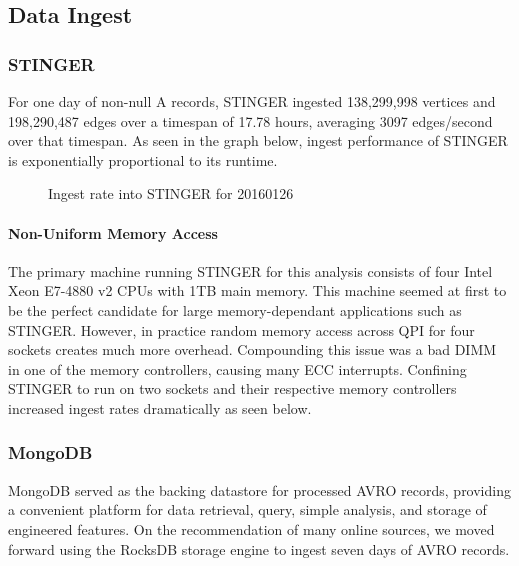 \documentclass{acm_proc_article-sp}
\begin{document}
\subsection{Data Ingest}

\subsubsection{STINGER}
For one day of non-null A records, STINGER ingested 138,299,998 vertices and 198,290,487 edges over a timespan of 17.78 hours, averaging 3097 edges/second over that timespan. As seen in the graph below, ingest performance of STINGER is exponentially proportional to its runtime.

\begin{figure}[ht!]
\centering
{}
\caption{Ingest rate into STINGER for 20160126 \label{overflow}}
\end{figure}

\paragraph{Non-Uniform Memory Access}
The primary machine running STINGER for this analysis consists of four Intel Xeon E7-4880 v2 CPUs with 1TB main memory. This machine seemed at first to be the perfect candidate for large memory-dependant applications such as STINGER. However, in practice random memory access across QPI for four sockets creates much more overhead. Compounding this issue was a bad DIMM in one of the memory controllers, causing many ECC interrupts. Confining STINGER to run on two sockets and their respective memory controllers increased ingest rates dramatically as seen below.


\subsubsection{MongoDB}
MongoDB served as the backing datastore for processed AVRO records, providing a convenient platform for data retrieval, query, simple analysis, and storage of engineered features. On the recommendation of many online sources, we moved forward using the RocksDB storage engine to ingest seven days of AVRO records.
\end{document}
